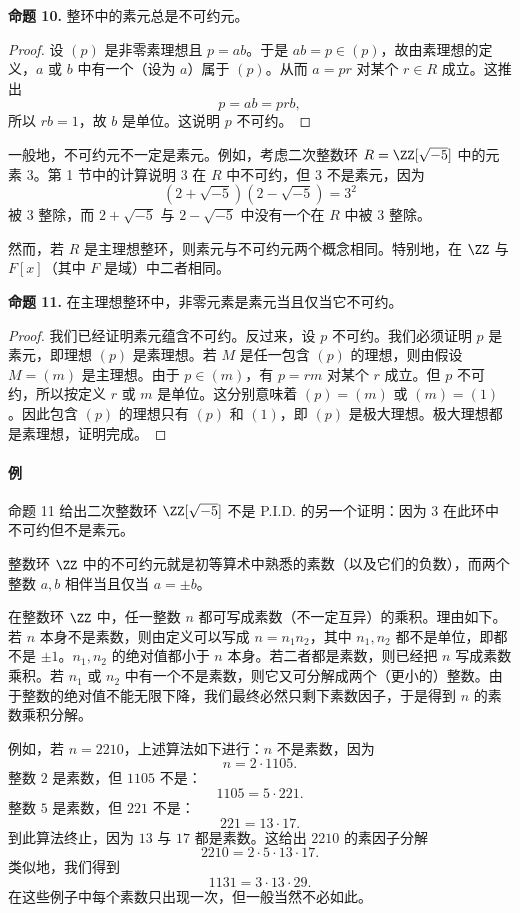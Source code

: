 \medskip
\noindent\textbf{命题 10.}
整环中的素元总是不可约元。

\begin{proof}
	设 $(p)$ 是非零素理想且 $p=ab$。于是 $ab=p\in(p)$，故由素理想的定义，$a$ 或 $b$ 中有一个（设为 $a$）属于 $(p)$。从而 $a=pr$ 对某个 $r\in R$ 成立。这推出
	\[
	p=ab=prb,
	\]
	所以 $rb=1$，故 $b$ 是单位。这说明 $p$ 不可约。
\end{proof}

一般地，不可约元不一定是素元。例如，考虑二次整数环 $R=\ZZ[\sqrt{-5}]$ 中的元素 $3$。第 1 节中的计算说明 $3$ 在 $R$ 中不可约，但 $3$ 不是素元，因为
\[
(2+\sqrt{-5})(2-\sqrt{-5})=3^2
\]
被 $3$ 整除，而 $2+\sqrt{-5}$ 与 $2-\sqrt{-5}$ 中没有一个在 $R$ 中被 $3$ 整除。

然而，若 $R$ 是主理想整环，则素元与不可约元两个概念相同。特别地，在 $\ZZ$ 与 $F[x]$（其中 $F$ 是域）中二者相同。

\medskip
\noindent\textbf{命题 11.}
在主理想整环中，非零元素是素元当且仅当它不可约。

\begin{proof}
	我们已经证明素元蕴含不可约。反过来，设 $p$ 不可约。我们必须证明 $p$ 是素元，即理想 $(p)$ 是素理想。若 $M$ 是任一包含 $(p)$ 的理想，则由假设 $M=(m)$ 是主理想。由于 $p\in(m)$，有 $p=rm$ 对某个 $r$ 成立。但 $p$ 不可约，所以按定义 $r$ 或 $m$ 是单位。这分别意味着 $(p)=(m)$ 或 $(m)=(1)$。因此包含 $(p)$ 的理想只有 $(p)$ 和 $(1)$，即 $(p)$ 是极大理想。极大理想都是素理想，证明完成。
\end{proof}

\paragraph{例}
命题 11 给出二次整数环 $\ZZ[\sqrt{-5}]$ 不是 P.I.D. 的另一个证明：因为 $3$ 在此环中不可约但不是素元。

整数环 $\ZZ$ 中的不可约元就是初等算术中熟悉的素数（以及它们的负数），而两个整数 $a,b$ 相伴当且仅当 $a=\pm b$。

在整数环 $\ZZ$ 中，任一整数 $n$ 都可写成素数（不一定互异）的乘积。理由如下。若 $n$ 本身不是素数，则由定义可以写成 $n=n_1n_2$，其中 $n_1,n_2$ 都不是单位，即都不是 $\pm1$。$n_1,n_2$ 的绝对值都小于 $n$ 本身。若二者都是素数，则已经把 $n$ 写成素数乘积。若 $n_1$ 或 $n_2$ 中有一个不是素数，则它又可分解成两个（更小的）整数。由于整数的绝对值不能无限下降，我们最终必然只剩下素数因子，于是得到 $n$ 的素数乘积分解。

例如，若 $n=2210$，上述算法如下进行：$n$ 不是素数，因为
\[
n=2\cdot1105.
\]
整数 $2$ 是素数，但 $1105$ 不是：
\[
1105=5\cdot221.
\]
整数 $5$ 是素数，但 $221$ 不是：
\[
221=13\cdot17.
\]
到此算法终止，因为 $13$ 与 $17$ 都是素数。这给出 $2210$ 的素因子分解
\[
2210=2\cdot5\cdot13\cdot17.
\]
类似地，我们得到
\[
1131=3\cdot13\cdot29.
\]
在这些例子中每个素数只出现一次，但一般当然不必如此。

